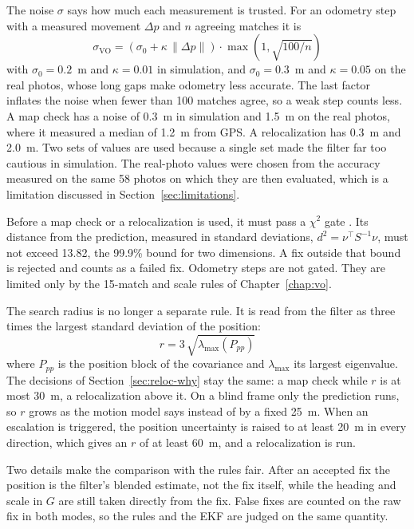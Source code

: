 \documentclass[english, Lau, oneside]{sapthesis}%
\begin{document}
The noise $\sigma$ says how much each measurement is trusted. For an odometry step with a measured movement $\Delta p$ and $n$ agreeing matches it is
\begin{equation}
  \sigma_{\mathrm{VO}} = \left(\sigma_0 + \kappa\,\lVert \Delta p \rVert\right)\cdot \max\!\left(1, \sqrt{100 / n}\right)
  \label{eq:ekf-sigma-vo}
\end{equation}
with $\sigma_0 = 0.2$~m and $\kappa = 0.01$ in simulation, and $\sigma_0 = 0.3$~m and $\kappa = 0.05$ on the real photos, whose long gaps make odometry less accurate. The last factor inflates the noise when fewer than 100 matches agree, so a weak step counts less. A map check has a noise of 0.3~m in simulation and 1.5~m on the real photos, where it measured a median of 1.2~m from GPS. A relocalization has 0.3~m and 2.0~m. Two sets of values are used because a single set made the filter far too cautious in simulation. The real-photo values were chosen from the accuracy measured on the same 58 photos on which they are then evaluated, which is a limitation discussed in Section~\ref{sec:limitations}.

Before a map check or a relocalization is used, it must pass a $\chi^2$ gate \citep{barshalom2001}. Its distance from the prediction, measured in standard deviations, $d^2 = \nu^{\top} S^{-1} \nu$, must not exceed 13.82, the 99.9\% bound for two dimensions. A fix outside that bound is rejected and counts as a failed fix. Odometry steps are not gated. They are limited only by the 15-match and scale rules of Chapter~\ref{chap:vo}.

The search radius is no longer a separate rule. It is read from the filter as three times the largest standard deviation of the position:
\begin{equation}
  r = 3\,\sqrt{\lambda_{\max}(P_{pp})}
  \label{eq:ekf-radius}
\end{equation}
where $P_{pp}$ is the position block of the covariance and $\lambda_{\max}$ its largest eigenvalue. The decisions of Section~\ref{sec:reloc-why} stay the same: a map check while $r$ is at most 30~m, a relocalization above it. On a blind frame only the prediction runs, so $r$ grows as the motion model says instead of by a fixed 25~m. When an escalation is triggered, the position uncertainty is raised to at least 20~m in every direction, which gives an $r$ of at least 60~m, and a relocalization is run.

Two details make the comparison with the rules fair. After an accepted fix the position is the filter's blended estimate, not the fix itself, while the heading and scale in $G$ are still taken directly from the fix. False fixes are counted on the raw fix in both modes, so the rules and the EKF are judged on the same quantity.
\end{document}
